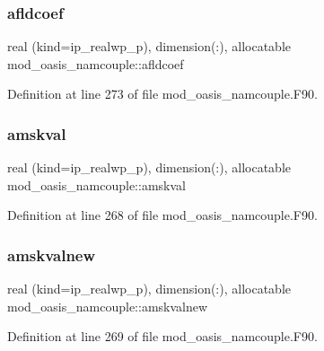 \subsubsection{\texorpdfstring{afldcoef}{afldcoef}}
{\footnotesize\ttfamily real (kind=ip\+\_\+realwp\+\_\+p), dimension(\+:), allocatable mod\+\_\+oasis\+\_\+namcouple\+::afldcoef\hspace{0.3cm}{\ttfamily [private]}}



Definition at line 273 of file mod\+\_\+oasis\+\_\+namcouple.\+F90.

\mbox{\label{namespacemod__oasis__namcouple_a92d43fa5eaaff81f0e3f73b303377c02}} 
\subsubsection{\texorpdfstring{amskval}{amskval}}
{\footnotesize\ttfamily real (kind=ip\+\_\+realwp\+\_\+p), dimension(\+:), allocatable mod\+\_\+oasis\+\_\+namcouple\+::amskval\hspace{0.3cm}{\ttfamily [private]}}



Definition at line 268 of file mod\+\_\+oasis\+\_\+namcouple.\+F90.

\mbox{\label{namespacemod__oasis__namcouple_a3598202174da65117caf675065f8b160}} 
\subsubsection{\texorpdfstring{amskvalnew}{amskvalnew}}
{\footnotesize\ttfamily real (kind=ip\+\_\+realwp\+\_\+p), dimension(\+:), allocatable mod\+\_\+oasis\+\_\+namcouple\+::amskvalnew\hspace{0.3cm}{\ttfamily [private]}}



Definition at line 269 of file mod\+\_\+oasis\+\_\+namcouple.\+F90.

\mbox{\label{namespacemod__oasis__namcouple_ae61173ac38ba4ae398fb0d4bef686f7d}} 

